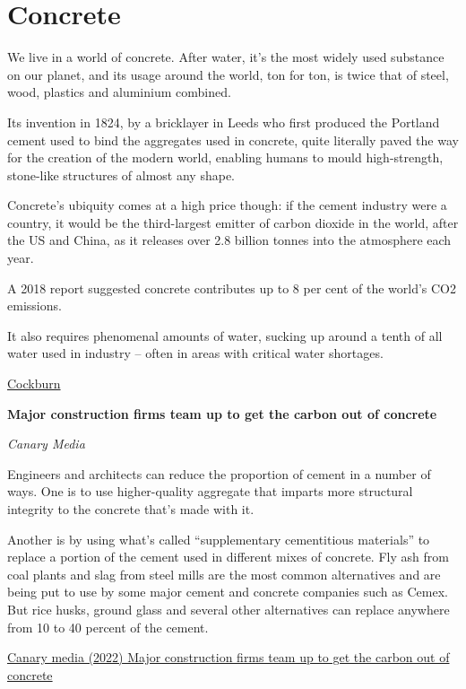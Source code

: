 \documentclass[
]{book}
\begin{document}
\hypertarget{concrete}{%
\chapter{Concrete}\label{concrete}}

We live in a world of concrete. After water, it's the most widely used substance on our planet, and its usage around the world, ton for ton, is twice that of steel, wood, plastics and aluminium combined.

Its invention in 1824, by a bricklayer in Leeds who first produced the Portland cement used to bind the aggregates used in concrete, quite literally paved the way for the creation of the modern world, enabling humans to mould high-strength, stone-like structures of almost any shape.

Concrete's ubiquity comes at a high price though: if the cement industry were a country, it would be the third-largest emitter of carbon dioxide in the world, after the US and China, as it releases over 2.8 billion tonnes into the atmosphere each year.

A 2018 report suggested concrete contributes up to 8 per cent of the world's CO2 emissions.

It also requires phenomenal amounts of water, sucking up around a tenth of all water used in industry -- often in areas with critical water shortages.

\href{https://www.independent.co.uk/climate-change/news/wood-construction-concrete-steel-climate-b1796342.html}{Cockburn}

\textbf{Major construction firms team up to get the carbon out of concrete}

\emph{Canary Media}

Engineers and architects can reduce the proportion of cement in a number of ways.
One is to use higher-quality aggregate that imparts more structural integrity to the concrete that's made with it.

Another is by using what's called \hspace{0pt}``supplementary cementitious materials'' to replace a portion of the cement used in different mixes of concrete. Fly ash from coal plants and slag from steel mills are the most common alternatives and are being put to use by some major cement and concrete companies such as Cemex. But rice husks, ground glass and several other alternatives can replace anywhere from 10 to 40 percent of the cement.

\href{https://www.canarymedia.com/articles/clean-industry/major-construction-firms-team-up-to-get-the-carbon-out-of-concrete}{Canary media (2022) Major construction firms team up to get the carbon out of concrete}
\end{document}
